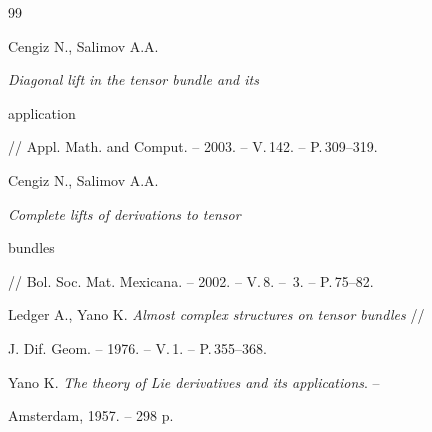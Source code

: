 \begin{thebibliography}{99}


Cengiz N., Salimov A.A. {\em Diagonal lift in the tensor bundle and its


application} // Appl. Math. and Comput. -- 2003. -- V.\,142. -- P.\,309--319.







Cengiz N., Salimov A.A. {\em Complete lifts of derivations to tensor


bundles}


// Bol. Soc. Mat. Mexicana. -- 2002. -- V.\,8. -- \No\,3. -- P.\,75--82.







Ledger A., Yano K. {\em Almost complex structures on tensor bundles} //


J. Dif. Geom. -- 1976. -- V.\,1. -- P.\,355--368.







Yano K. {\em The theory of Lie derivatives and its applications}. --


Amsterdam, 1957. -- 298 p.





\end{thebibliography}





\vskip 2cm












\label{end}































